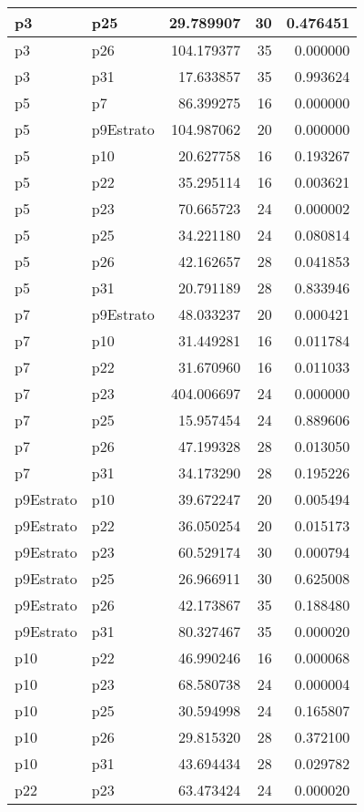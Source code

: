 \begin{table}
\begin{tabular}[t]{l|l|r|r|r}
\hline
p3 & p25 & 29.789907 & 30 & 0.476451\\
\hline
p3 & p26 & 104.179377 & 35 & 0.000000\\
\hline
p3 & p31 & 17.633857 & 35 & 0.993624\\
\hline
p5 & p7 & 86.399275 & 16 & 0.000000\\
\hline
p5 & p9Estrato & 104.987062 & 20 & 0.000000\\
\hline
p5 & p10 & 20.627758 & 16 & 0.193267\\
\hline
p5 & p22 & 35.295114 & 16 & 0.003621\\
\hline
p5 & p23 & 70.665723 & 24 & 0.000002\\
\hline
p5 & p25 & 34.221180 & 24 & 0.080814\\
\hline
p5 & p26 & 42.162657 & 28 & 0.041853\\
\hline
p5 & p31 & 20.791189 & 28 & 0.833946\\
\hline
p7 & p9Estrato & 48.033237 & 20 & 0.000421\\
\hline
p7 & p10 & 31.449281 & 16 & 0.011784\\
\hline
p7 & p22 & 31.670960 & 16 & 0.011033\\
\hline
p7 & p23 & 404.006697 & 24 & 0.000000\\
\hline
p7 & p25 & 15.957454 & 24 & 0.889606\\
\hline
p7 & p26 & 47.199328 & 28 & 0.013050\\
\hline
p7 & p31 & 34.173290 & 28 & 0.195226\\
\hline
p9Estrato & p10 & 39.672247 & 20 & 0.005494\\
\hline
p9Estrato & p22 & 36.050254 & 20 & 0.015173\\
\hline
p9Estrato & p23 & 60.529174 & 30 & 0.000794\\
\hline
p9Estrato & p25 & 26.966911 & 30 & 0.625008\\
\hline
p9Estrato & p26 & 42.173867 & 35 & 0.188480\\
\hline
p9Estrato & p31 & 80.327467 & 35 & 0.000020\\
\hline
p10 & p22 & 46.990246 & 16 & 0.000068\\
\hline
p10 & p23 & 68.580738 & 24 & 0.000004\\
\hline
p10 & p25 & 30.594998 & 24 & 0.165807\\
\hline
p10 & p26 & 29.815320 & 28 & 0.372100\\
\hline
p10 & p31 & 43.694434 & 28 & 0.029782\\
\hline
p22 & p23 & 63.473424 & 24 & 0.000020\\

\end{tabular}
\end{table}
